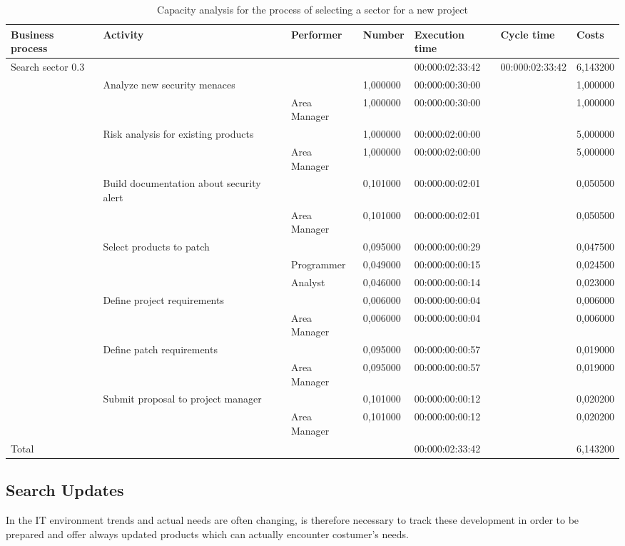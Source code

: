 \begin{landscape}
\centering
\begin{table}
{\tiny
\begin{tabular}{|l|l|l|l|l|l|l|}
Business process&Activity&Performer&Number&Execution time&Cycle
time&Costs\\
\hline
Search sector 0.3&&&&00:000:02:33:42&00:000:02:33:42&6,143200\\
\hline
&Analyze new security menaces &&1,000000&00:000:00:30:00&&1,000000\\
\hline
&&Area Manager &1,000000&00:000:00:30:00&&1,000000\\
\hline
&Risk analysis for existing products &&1,000000&00:000:02:00:00&&5,000000\\
\hline
&&Area Manager &1,000000&00:000:02:00:00&&5,000000\\
\hline
&Build documentation about security alert &&0,101000&00:000:00:02:01&&0,050500\\
\hline
&&Area Manager &0,101000&00:000:00:02:01&&0,050500\\
\hline
&Select products to patch &&0,095000&00:000:00:00:29&&0,047500\\
\hline
&&Programmer &0,049000&00:000:00:00:15&&0,024500\\
\hline
&&Analyst &0,046000&00:000:00:00:14&&0,023000\\
\hline
&Define project requirements &&0,006000&00:000:00:00:04&&0,006000\\
\hline
&&Area Manager &0,006000&00:000:00:00:04&&0,006000\\
\hline
&Define patch requirements &&0,095000&00:000:00:00:57&&0,019000\\
\hline
&&Area Manager &0,095000&00:000:00:00:57&&0,019000\\
\hline
&Submit proposal to project manager &&0,101000&00:000:00:00:12&&0,020200\\
\hline
&&Area Manager &0,101000&00:000:00:00:12&&0,020200\\
\hline
Total&&&&00:000:02:33:42&&6,143200\\
\hline
\end{tabular}
}
\caption{Capacity analysis for the process of selecting a sector for a new project} 
\label{2tab:sector}
\end{table}
\end{landscape}





\subsection{Search Updates}
In the IT environment trends and actual needs are often changing, is
therefore necessary to track these development in order to be prepared and
offer always updated products which can actually encounter costumer's
needs.

